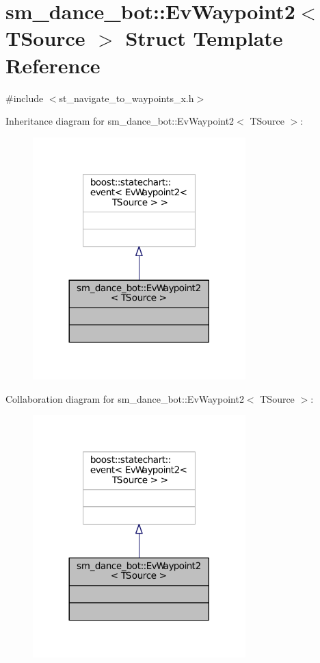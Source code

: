 \hypertarget{structsm__dance__bot_1_1EvWaypoint2}{}\section{sm\+\_\+dance\+\_\+bot\+:\+:Ev\+Waypoint2$<$ T\+Source $>$ Struct Template Reference}
\label{structsm__dance__bot_1_1EvWaypoint2}


{\ttfamily \#include $<$st\+\_\+navigate\+\_\+to\+\_\+waypoints\+\_\+x.\+h$>$}



Inheritance diagram for sm\+\_\+dance\+\_\+bot\+:\+:Ev\+Waypoint2$<$ T\+Source $>$\+:
\nopagebreak
\begin{figure}[H]
\begin{center}
\leavevmode
\includegraphics[width=233pt]{structsm__dance__bot_1_1EvWaypoint2__inherit__graph}
\end{center}
\end{figure}


Collaboration diagram for sm\+\_\+dance\+\_\+bot\+:\+:Ev\+Waypoint2$<$ T\+Source $>$\+:
\nopagebreak
\begin{figure}[H]
\begin{center}
\leavevmode
\includegraphics[width=233pt]{structsm__dance__bot_1_1EvWaypoint2__coll__graph}
\end{center}
\end{figure}


